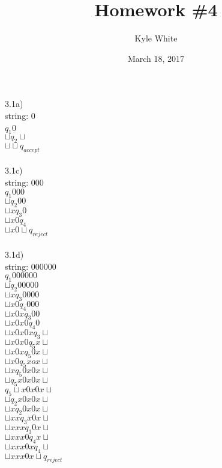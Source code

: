\documentclass[11pt]{article}
\title{Homework \#4}
\author{Kyle White}
\date{March 18, 2017}
\begin{document}
\maketitle

\noindent3.1a)\\
string: 0\\
$q_1$0\\
$\sqcup q_2 \sqcup$\\
$\sqcup \sqcup q_{accept}$\\ \\


\noindent3.1c)\\
string: 000\\
$q_1 000$\\
$\sqcup q_2 00$\\
$\sqcup x q_3 0$\\
$\sqcup x 0 q_4$\\
$\sqcup x 0 \sqcup q_{reject}$\\ \\

\noindent3.1d)\\
string: 000000\\
$q_1 000000$\\
$\sqcup q_2 00000$\\
$\sqcup x q_3 0000$\\
$\sqcup x 0 q_4 000$\\
$\sqcup x 0 x q_3 00$\\
$\sqcup x 0 x 0 q_4 0$\\
$\sqcup x 0 x 0 x q_3 \sqcup$\\
$\sqcup x 0 x 0 q_5 x \sqcup$\\
$\sqcup x 0 x q_5 0 x \sqcup$\\
$\sqcup x 0 q_5 x o x \sqcup$\\
$\sqcup x q_5 0 x 0 x \sqcup$\\
$\sqcup q_5 x 0 x 0 x \sqcup$\\
$q_5 \sqcup x 0 x 0 x \sqcup$\\
$\sqcup q_2 x 0 x 0 x \sqcup$\\
$\sqcup x q_2 0 x 0 x \sqcup$\\
$\sqcup x x q_3 x 0 x \sqcup$\\
$\sqcup x x x q_3 0 x \sqcup$\\
$\sqcup x x x 0 q_4 x \sqcup$\\
$\sqcup x x x 0 x q_4 \sqcup$\\
$\sqcup x x x 0 x \sqcup q_{reject}$\\ \\
\end{document}

